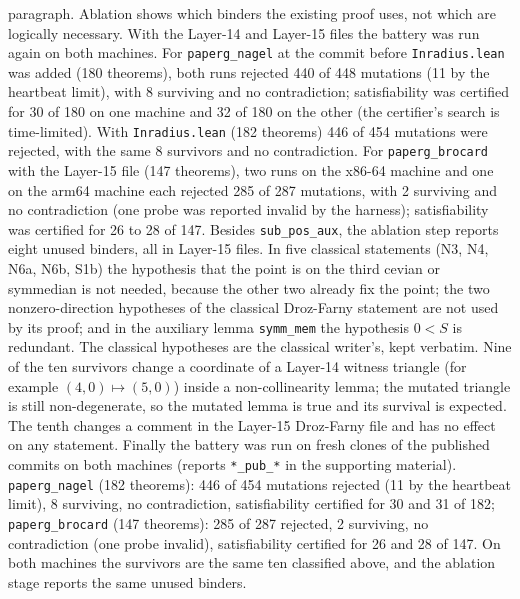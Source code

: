 \documentclass[11pt]{article}
\theoremstyle{definition}
\theoremstyle{remark}
\newcommand{\lean}[1]{\texttt{#1}}
\begin{document}
paragraph. Ablation shows which binders the existing proof uses, not which are logically necessary.
With the Layer-14 and Layer-15 files the battery was run again on both machines. For
\lean{paperg\_nagel} at the commit before \lean{Inradius.lean} was added (180 theorems), both runs
rejected 440 of 448 mutations (11 by the heartbeat limit), with 8 surviving and no contradiction;
satisfiability was certified for 30 of 180 on one machine and 32 of 180 on the other (the certifier's
search is time-limited). With \lean{Inradius.lean} (182 theorems) 446 of 454 mutations were rejected,
with the same 8 survivors and no contradiction. For \lean{paperg\_brocard} with the Layer-15 file (147
theorems), two runs on the x86-64 machine and one on the arm64 machine each rejected 285 of 287
mutations, with 2 surviving and no contradiction (one probe was reported invalid by the harness);
satisfiability was certified for 26 to 28 of 147. Besides \lean{sub\_pos\_aux}, the ablation step reports eight unused binders, all in Layer-15 files.
In five classical statements (N3, N4, N6a, N6b, S1b) the hypothesis that the point is on the third
cevian or symmedian is not needed, because the other two already fix the point; the two
nonzero-direction hypotheses of the classical Droz-Farny statement are not used by its proof; and in
the auxiliary lemma \lean{symm\_mem} the hypothesis $0<S$ is redundant. The classical hypotheses are
the classical writer's, kept verbatim. Nine of the ten survivors change a coordinate of a Layer-14
witness triangle (for example $(4,0)\mapsto(5,0)$) inside a non-collinearity lemma; the mutated
triangle is still non-degenerate, so the mutated lemma is true and its survival is expected. The tenth
changes a comment in the Layer-15 Droz-Farny file and has no effect on any statement.
Finally the battery was run on fresh clones of the published commits on both machines (reports
\lean{*\_pub\_*} in the supporting material). \lean{paperg\_nagel} (182 theorems): 446 of 454
mutations rejected (11 by the heartbeat limit), 8 surviving, no contradiction, satisfiability
certified for 30 and 31 of 182; \lean{paperg\_brocard} (147 theorems): 285 of 287 rejected, 2
surviving, no contradiction (one probe invalid), satisfiability certified for 26 and 28 of 147. On
both machines the survivors are the same ten classified above, and the ablation stage reports the same
unused binders.
\end{document}

